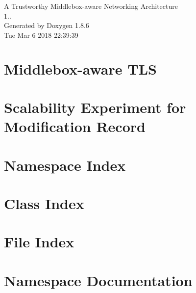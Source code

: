 \documentclass[twoside]{book}
\newcommand{\clearemptydoublepage}{%
  \newpage{\pagestyle{empty}\cleardoublepage}%
}
\begin{document}
\hypersetup{pageanchor=false}
\begin{titlepage}
\vspace*{7cm}
\begin{center}%
{\Large A Trustworthy Middlebox-\/aware Networking Architecture \\[1ex]\large 1.. }\\
\vspace*{1cm}
{\large Generated by Doxygen 1.8.6}\\
\vspace*{0.5cm}
{\small Tue Mar 6 2018 22:39:39}\\
\end{center}
\end{titlepage}
\clearemptydoublepage
\tableofcontents
\clearemptydoublepage
{}
\hypersetup{pageanchor=true}

\chapter{Middlebox-\/aware T\-L\-S}
\label{md_README}
\hypertarget{md_README}{}

\chapter{Scalability Experiment for Modification Record}
\label{md_record_README}
\hypertarget{md_record_README}{}

\chapter{Namespace Index}

\chapter{Class Index}

\chapter{File Index}

\chapter{Namespace Documentation}




















\end{document}
